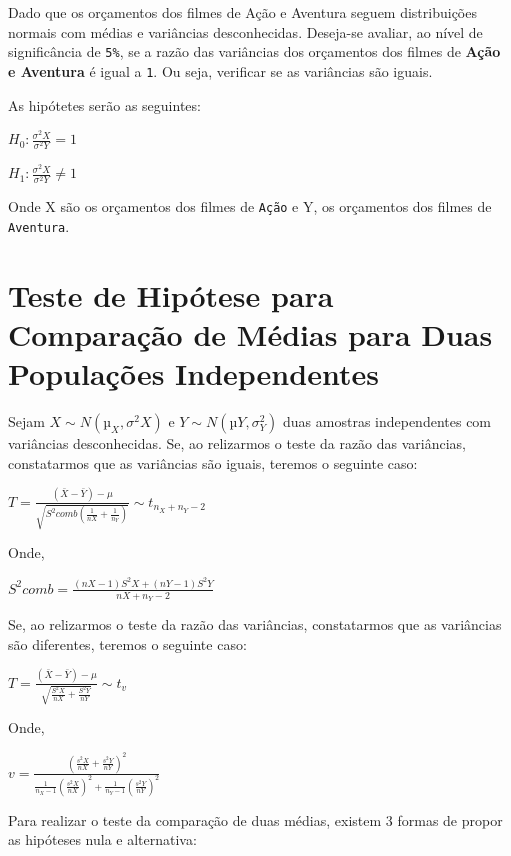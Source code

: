 \documentclass[
  letterpaper,
  DIV=11,
  numbers=noendperiod]{scrreprt}
\begin{document}
Dado que os orçamentos dos filmes de Ação e Aventura seguem
distribuições normais com médias e variâncias desconhecidas. Deseja-se
avaliar, ao nível de significância de \texttt{5\%}, se a razão das
variâncias dos orçamentos dos filmes de \textbf{Ação e Aventura} é igual
a \texttt{1}. Ou seja, verificar se as variâncias são iguais.

As hipótetes serão as seguintes:

\(H_{0} : \frac{\sigma^2{X}}{\sigma^2{Y}} = 1\)

\(H_{1} : \frac{\sigma^2{X}}{\sigma^2{Y}}\neq 1\)

Onde X são os orçamentos dos filmes de \texttt{Ação} e Y, os orçamentos
dos filmes de \texttt{Aventura}.

\hypertarget{teste-de-hipuxf3tese-para-comparauxe7uxe3o-de-muxe9dias-para-duas-populauxe7uxf5es-independentes}{%
\section{Teste de Hipótese para Comparação de Médias para Duas
Populações
Independentes}\label{teste-de-hipuxf3tese-para-comparauxe7uxe3o-de-muxe9dias-para-duas-populauxe7uxf5es-independentes}}

Sejam \({X \sim N(µ_{X}, σ^2{X})}\) e \({Y \sim N(µ{Y}, σ^2_{Y})}\) duas
amostras independentes com variâncias desconhecidas. Se, ao relizarmos o
teste da razão das variâncias, constatarmos que as variâncias são
iguais, teremos o seguinte caso:

\(T = \frac{ (\bar{X} - \bar{Y}) - \mu }{ \sqrt{S^2{comb} \left ( \frac{1}{n{X}} + \frac{1}{n_{Y}} \right ) } } \sim t_{n_{X} + n_{Y} - 2}\)

Onde,

\(S^{2}{comb} = \frac{(n{X} - 1)S^2{X} + (n{Y} - 1)S^2{Y}}{n{X} + n_{Y} - 2}\)

Se, ao relizarmos o teste da razão das variâncias, constatarmos que as
variâncias são diferentes, teremos o seguinte caso:

\(T = \frac{ (\bar{X} - \bar{Y}) - \mu }{ \sqrt{ \frac{S^2{X}}{n{X}} + \frac{S^2{Y}}{n{Y}} } } \sim t_{v}\)

Onde,

\(v = \frac{ \left ( \frac{s^2{X}}{n{X}} + \frac{s^2{Y}}{n{Y}} \right )^2 }{ \frac{1}{n_{X} - 1}\left ( \frac{s^2{X}}{n{X}} \right )^2 + \frac{1}{n_{Y} - 1}\left ( \frac{s^2{Y}}{n{Y}} \right )^2 }\)

Para realizar o teste da comparação de duas médias, existem 3 formas de
propor as hipóteses nula e alternativa:
\end{document}
